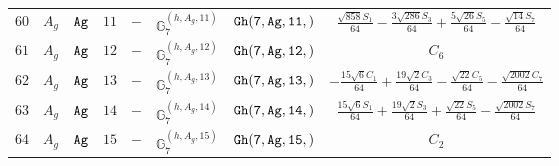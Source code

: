 \documentclass[fleqn,8pt]{jsarticle}
\begin{document}
\begin{table}[ht!]
\begin{center}
\begin{tabular}{cccccccc}
$ 60 $ & $ A_{g} $ & $ {\tt Ag} $ & $ 11 $ & $ - $ & $ \mathbb{G}_{7}^{(h,A_{g},11)} $ & $ {\tt Gh(7,Ag,11,)} $ & $ \frac{\sqrt{858} S_{1}}{64} - \frac{3 \sqrt{286} S_{3}}{64} + \frac{5 \sqrt{26} S_{5}}{64} - \frac{\sqrt{14} S_{7}}{64} $ \\
$ 61 $ & $ A_{g} $ & $ {\tt Ag} $ & $ 12 $ & $ - $ & $ \mathbb{G}_{7}^{(h,A_{g},12)} $ & $ {\tt Gh(7,Ag,12,)} $ & $ C_{6} $ \\
$ 62 $ & $ A_{g} $ & $ {\tt Ag} $ & $ 13 $ & $ - $ & $ \mathbb{G}_{7}^{(h,A_{g},13)} $ & $ {\tt Gh(7,Ag,13,)} $ & $ - \frac{15 \sqrt{6} C_{1}}{64} + \frac{19 \sqrt{2} C_{3}}{64} - \frac{\sqrt{22} C_{5}}{64} - \frac{\sqrt{2002} C_{7}}{64} $ \\
$ 63 $ & $ A_{g} $ & $ {\tt Ag} $ & $ 14 $ & $ - $ & $ \mathbb{G}_{7}^{(h,A_{g},14)} $ & $ {\tt Gh(7,Ag,14,)} $ & $ \frac{15 \sqrt{6} S_{1}}{64} + \frac{19 \sqrt{2} S_{3}}{64} + \frac{\sqrt{22} S_{5}}{64} - \frac{\sqrt{2002} S_{7}}{64} $ \\
$ 64 $ & $ A_{g} $ & $ {\tt Ag} $ & $ 15 $ & $ - $ & $ \mathbb{G}_{7}^{(h,A_{g},15)} $ & $ {\tt Gh(7,Ag,15,)} $ & $ C_{2} $ \\
 \hline \hline
\end{tabular}
\end{center}
\end{table}
\end{document}

